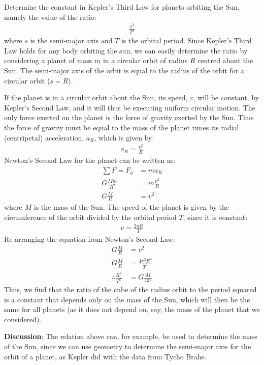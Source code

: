 \begin{example}{\label{ex:gravity:keplerconstant}Determine the constant in Kepler's Third Law for planets orbiting the Sun, namely the value of the ratio:
\begin{align*}
\frac{s^3}{T^2}
\end{align*}
where $s$ is the semi-major axis and $T$ is the orbital period.
}
Since Kepler's Third Law holds for any body orbiting the sun, we can easily determine the ratio by considering a planet of mass $m$ in a circular orbit of radius $R$ centred about the Sun. The semi-major axis of the orbit is equal to the radius of the orbit for a circular orbit ($s=R$).

If the planet is in a circular orbit about the Sun, its speed, $v$, will be constant, by Kepler's Second Law, and it will thus be executing uniform circular motion. The only force exerted on the planet is the force of gravity exerted by the Sun. Thus the force of gravity must be equal to the mass of the planet times its radial (centripetal) acceleration, $a_R$, which is given by:
\begin{align*}
a_R=\frac{v^2}{R}
\end{align*}
Newton's Second Law for the planet can be written as:
\begin{align*}
\sum F = F_g &= ma_R\\
G\frac{Mm}{R^2}&=m\frac{v^2}{R}\\
G\frac{M}{R}&=v^2
\end{align*}
where $M$ is the mass of the Sun. The speed of the planet is given by the circumference of the orbit divided by the orbital period $T$, since it is constant:
\begin{align*}
v=\frac{2\pi R}{T}
\end{align*}
Re-arranging the equation from Newton's Second Law:
\begin{align*}
G\frac{M}{R}&=v^2\\
G\frac{M}{R}&=\frac{4\pi^2 R^2}{T^2}\\
\therefore \frac{R^3}{T^2}&=G\frac{M}{4\pi^2}
\end{align*}
Thus, we find that the ratio of the cube of the radius orbit to the period squared is a constant that depends only on the mass of the Sun, which will then be the same for all planets (as it does not depend on, say, the mass of the planet that we considered).

\textbf{Discussion}: The relation above can, for example, be used to determine the mass of the Sun, since we can use geometry to determine the semi-major axis for the orbit of a planet, as Kepler did with the data from Tycho Brahe.
\end{example}


